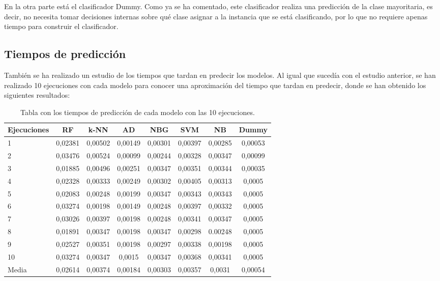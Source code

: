 En la otra parte está el clasificador Dummy. Como ya se ha comentado, este clasificador realiza una predicción de la clase mayoritaria, es decir, no necesita tomar decisiones internas sobre qué clase asignar a la instancia que se está clasificando, por lo que no requiere apenas tiempo para construir el clasificador.

\subsection{Tiempos de predicción}
También se ha realizado un estudio de los tiempos que tardan en predecir los modelos. Al igual que sucedía con el estudio anterior, se han realizado 10 ejecuciones con cada modelo para conocer una aproximación del tiempo que tardan en predecir, donde se han obtenido los siguientes resultados:

\begin{table}[h]
	\begin{center}
		\begin{tabular}{ l c c c c c c c }
			\hline
			\textbf{Ejecuciones} & \textbf{RF} & \textbf{k-NN} & \textbf{AD} & \textbf{NBG} & \textbf{SVM} & \textbf{NB} & \textbf{Dummy} \\ \hline
			1 & 0,02381 & 0,00502 & 0,00149 & 0,00301 & 0,00397 & 0,00285 & 0,00053 \\
			2 & 0,03476 & 0,00524 & 0,00099 & 0,00244 & 0,00328 & 0,00347 & 0,00099 \\ 
			3 & 0,01885 & 0,00496 & 0,00251 & 0,00347 & 0,00351 & 0,00344 & 0,00035 \\
			4 & 0,02328 & 0,00333 & 0,00249 & 0,00302 & 0,00405 & 0,00313 & 0,0005 \\
			5 & 0,02083 & 0,00248 & 0,00199 & 0,00347 & 0,00343 & 0,00343 & 0,0005 \\
			6 & 0,03274 & 0,00198 & 0,00149 & 0,00248 & 0,00397 & 0,00332 & 0,0005 \\
			7 & 0,03026 & 0,00397 & 0,00198 & 0,00248 & 0,00341 & 0,00347 & 0,0005 \\
			8 & 0,01891 & 0,00347 & 0,00198 & 0,00347 & 0,00298 & 0.00248 & 0,0005 \\
			9 & 0,02527 & 0,00351 & 0,00198 & 0,00297 & 0,00338 & 0,00198 & 0,0005 \\
			10 & 0,03274 & 0,00347 & 0,0015 & 0,00347 & 0,00368 & 0,00341 & 0,0005 \\ \hline
			Media & 0,02614 & 0,00374 & 0,00184 & 0,00303 & 0,00357 & 0,0031 & 0,00054 \\ \hline
		\end{tabular}
		\caption{Tabla con los tiempos de predicción de cada modelo con las 10 ejecuciones.}
		\label{tab:tiempos_pred}
	\end{center}
\end{table}
 
